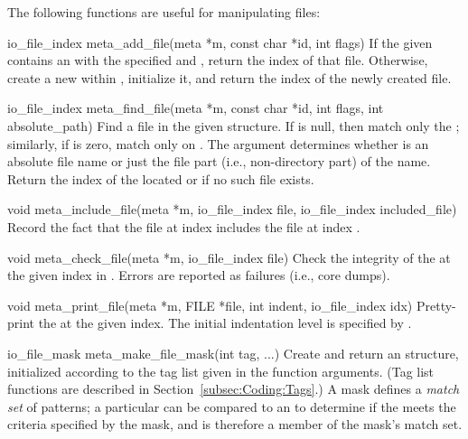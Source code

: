 \noindent The following functions are useful for manipulating files:

\begin{cprototypelist}
  \item[io_file_index meta_add_file(meta *m, const char *id, int flags)]
  If the given  contains an  with the specified
   and , return the index of that file.
  Otherwise, create a new  within , initialize
  it, and return the index of the newly created file.

  \item[io_file_index meta_find_file(meta *m, const char *id, int flags,
                                     int absolute_path)]
  Find a file in the given  structure.  If  is
  null, then match only the ; similarly, if
   is zero, match only on .  The
   argument determines whether  is
  an absolute file name or just the file part (i.e., non-directory part) of the
  name.  Return the index of the located  or  if no
  such file exists.

  \item[void meta_include_file(meta *m, io_file_index file,
                               io_file_index included_file)]
  Record the fact that the file at index  includes the file
  at index .

  \item[void meta_check_file(meta *m, io_file_index file)]
  Check the integrity of the  at the given index in
  .  Errors are reported as  failures (i.e., core
  dumps).

  \item[void meta_print_file(meta *m, FILE *file, int indent,
                             io_file_index idx)]
  Pretty-print the  at the given index.  The initial indentation
  level is specified by .

  \item[io_file_mask meta_make_file_mask(int tag, ...)]
  Create and return an  structure, initialized according to
  the tag list given in the function arguments.  (Tag list functions are
  described in Section~\ref{subsec:Coding:Tags}.)  A mask defines a \emph{match
  set} of  patterns; a particular  can be
  compared to an  to determine if the  meets
  the criteria specified by the mask, and is therefore a member of the mask's
  match set.


\end{cprototypelist}
